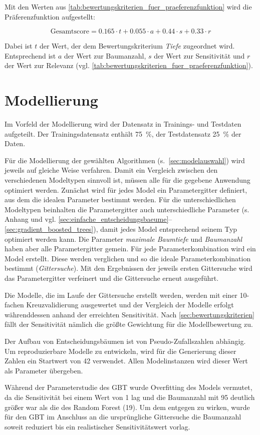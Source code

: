 Mit den Werten aus \cref{tab:bewertungskriterien_fuer_praeferenzfunktion} wird die Präferenzfunktion aufgestellt:

\begin{equation*}
	\text{Gesamtscore}=0.165\cdot t+
	0.055\cdot a+0.44\cdot s+0.33\cdot r
	\label{eq:praeferenzfunktion}
\end{equation*}

Dabei ist $t$ der Wert, der dem Bewertungskriterium \textit{Tiefe} zugeordnet wird. Entsprechend ist $a$ der Wert zur Baumanzahl, $s$ der Wert zur Sensitivität und $r$ der Wert zur Relevanz (vgl. \cref{tab:bewertungskriterien_fuer_praeferenzfunktion}).
\section{Modellierung}
\label{sec:modellierung}
Im Vorfeld der Modellierung wird der Datensatz in Trainings- und Testdaten aufgeteilt. Der Trainingsdatensatz enthält \SI{75}{\percent}, der Testdatensatz \SI{25}{\percent} der Daten. 

Für die Modellierung der gewählten Algorithmen (s.~\cref{sec:modelauswahl}) wird jeweils auf gleiche Weise verfahren. Damit ein Vergleich zwischen den verschiedenen Modeltypen sinnvoll ist, müssen alle für die gegebene Anwendung optimiert werden. Zunächst wird für jedes Model ein Parametergitter definiert, aus dem die idealen Parameter bestimmt werden. Für die unterschiedlichen Modeltypen beinhalten die Parametergitter auch unterschiedliche Parameter (s. Anhang und vgl. \cref{sec:einfache_entscheidungsbaeume}--\cref{sec:gradient_boosted_trees}), damit jedes Model entsprechend seinem Typ optimiert werden kann. Die Parameter \textit{maximale Baumtiefe} und \textit{Baumanzahl} haben aber alle Parametergitter gemein. Für jede Parameterkombination wird ein Model erstellt. Diese werden verglichen und so die ideale Parameterkombination bestimmt (\textit{Gittersuche}). Mit den Ergebnissen der jeweils ersten Gittersuche wird das Parametergitter verfeinert und die Gittersuche erneut ausgeführt.

Die Modelle, die im Laufe der Gittersuche erstellt werden, werden mit einer 10-fachen Kreuzvalidierung ausgewertet und der Vergleich der Modelle erfolgt währenddessen anhand der erreichten Sensitivität. Nach \cref{sec:bewertungskriterien} fällt der Sensitivität nämlich die größte Gewichtung für die Modellbewertung zu.

Der Aufbau von Entscheidungsbäumen ist von Pseudo-Zufallszahlen abhängig. Um reproduzierbare Modelle zu entwickeln, wird für die Generierung dieser Zahlen ein Startwert von \num{42} verwendet. Allen Modelinstanzen wird dieser Wert als Parameter übergeben.

Während der Parameterstudie des GBT wurde Overfitting des Models vermutet, da die Sensitivität bei einem Wert von \num{1} lag und die Baumanzahl mit \num{95} deutlich größer war als die des Random Forest (19). Um dem entgegen zu wirken, wurde für den GBT im Anschluss an die ursprüngliche Gittersuche die Baumanzahl soweit reduziert bis ein realistischer Sensitivitätswert vorlag.
